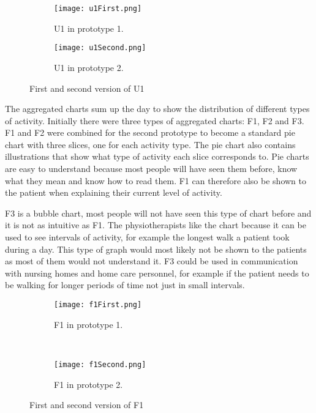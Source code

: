 \begin{figure}[h!]
  \centering
  \begin{subfigure}[b]{0.39\textwidth}
    \centering
    \texttt{[image: u1First.png]}
    \caption{U1 in prototype 1.}
  \end{subfigure}
  \begin{subfigure}[b]{0.29\textwidth}
    \centering
    \texttt{[image: u1Second.png]}
    \caption{U1 in prototype 2.}
  \end{subfigure} 
  \caption{First and second version of U1}
  \label{fig:uComparison}
\end{figure}

The aggregated charts sum up the day to show the distribution of different types of activity. Initially there were three types of aggregated charts: F1, F2 and F3. F1 and F2 were combined for the second prototype to become a standard pie chart with three slices, one for each activity type. The pie chart also contains illustrations that show what type of activity each slice corresponds to. Pie charts are easy to understand because most people will have seen them before, know what they mean and know how to read them. F1 can therefore also be shown to the patient when explaining their current level of activity. 

F3 is a bubble chart, most people will not have seen this type of chart before and it is not as intuitive as F1. The physiotherapists like the chart because it can be used to see intervals of activity, for example the longest walk a patient took during a day. This type of graph would most likely not be shown to the patients as most of them would not understand it. F3 could be used in communication with nursing homes and home care personnel, for example if the patient needs to be walking for longer periods of time not just in small intervals. 

\begin{figure}[h!]
  \centering
  \begin{subfigure}[b]{1\textwidth}
    \centering
    \texttt{[image: f1First.png]}
    \caption{F1 in prototype 1.}
  \end{subfigure}
  \\
  \begin{subfigure}[b]{0.6\textwidth}
    \centering
    \texttt{[image: f1Second.png]}
    \caption{F1 in prototype 2.}
  \end{subfigure} 
  \caption{First and second version of F1}
  \label{fig:fComparison}
\end{figure} 

